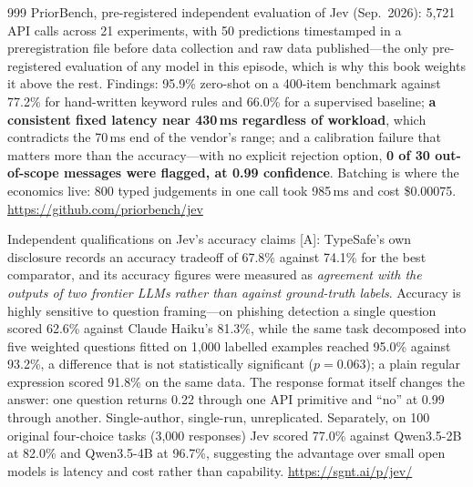 \begin{thebibliography}{999}
 PriorBench, pre-registered independent evaluation of Jev (Sep.\ 2026): 5,721 API calls across 21 experiments, with 50 predictions timestamped in a preregistration file before data collection and raw data published---the only pre-registered evaluation of any model in this episode, which is why this book weights it above the rest. Findings: 95.9\% zero-shot on a 400-item benchmark against 77.2\% for hand-written keyword rules and 66.0\% for a supervised baseline; \textbf{a consistent fixed latency near 430\,ms regardless of workload}, which contradicts the 70\,ms end of the vendor's range; and a calibration failure that matters more than the accuracy---with no explicit rejection option, \textbf{0 of 30 out-of-scope messages were flagged, at 0.99 confidence}. Batching is where the economics live: 800 typed judgements in one call took 985\,ms and cost \$0.00075. \url{https://github.com/priorbench/jev}

 Independent qualifications on Jev's accuracy claims [A]: TypeSafe's own disclosure records an accuracy tradeoff of 67.8\% against 74.1\% for the best comparator, and its accuracy figures were measured as \emph{agreement with the outputs of two frontier LLMs rather than against ground-truth labels}. Accuracy is highly sensitive to question framing---on phishing detection a single question scored 62.6\% against Claude Haiku's 81.3\%, while the same task decomposed into five weighted questions fitted on 1,000 labelled examples reached 95.0\% against 93.2\%, a difference that is not statistically significant ($p=0.063$); a plain regular expression scored 91.8\% on the same data. The response format itself changes the answer: one question returns 0.22 through one API primitive and ``no'' at 0.99 through another. Single-author, single-run, unreplicated. Separately, on 100 original four-choice tasks (3,000 responses) Jev scored 77.0\% against Qwen3.5-2B at 82.0\% and Qwen3.5-4B at 96.7\%, suggesting the advantage over small open models is latency and cost rather than capability. \url{https://sgnt.ai/p/jev/}


\end{thebibliography}
